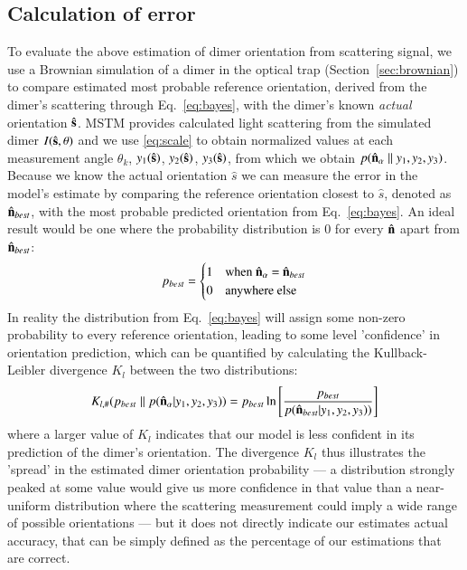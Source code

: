 \documentclass[final,  3p]{elsarticle}
\begin{document}
\subsection{Calculation of error}
\label{sec:divergence}
To evaluate the above estimation of dimer orientation from scattering signal, we use a Brownian simulation of a dimer in the optical trap (Section~\ref{sec:brownian}) to compare estimated most probable reference orientation, derived from the dimer's scattering through Eq.~\eqref{eq:bayes}, with the dimer's known \emph{actual} orientation $\hat{\bf s}$. MSTM provides calculated light scattering from the simulated dimer $I(\hat{\bf s}, \theta)$ and we use \eqref{eq:scale} to obtain normalized values at each measurement angle $\theta_k$,  $y_1(\hat{\bf s})$, $y_2(\hat{\bf s})$, $y_3(\hat{\bf s})$, from which we obtain $p(\hat{\bf n}_{\alpha}\parallel y_1, y_2, y_3)$. Because we know the actual orientation $\hat{s}$ we can measure the error in the model's estimate by comparing the reference orientation closest to $\hat{s}$, denoted as $\hat{\bf n}_{best}$, with the most probable predicted orientation from Eq.~\eqref{eq:bayes}. An ideal result would be one where the probability distribution is 0 for every $\hat{\bf n}$ apart from $\hat{\bf n}_{best}$:
\begin{align}
	\label{eq:best}
	p_{best} = 
	\begin{cases}
		1 & \text{when $\hat{\bf n}_\alpha$ = $\hat{\bf n}_{best}$}\\
		0 & \text{anywhere else}
	\end{cases}
\end{align}
In reality the distribution from Eq.~\eqref{eq:bayes} will assign some non-zero
probability to every reference orientation, leading to some level 'confidence' in orientation prediction, which can be quantified by calculating the Kullback-Leibler divergence $K_l$ between the two distributions:
\begin{align}
	K_{l, \#}(p_{best}\parallel p(\hat{\bf n}_\alpha| y_1, y_2, y_3))
	= p_{best}\ln \left[\frac{p_{best}}{p(\hat{\bf n}_{best}| y_1,y_2,y_3))}
	\right]
	\label{eq;kullback}
\end{align}
where a larger value of $K_l$ indicates that our model is less confident in its
prediction of the dimer's orientation. The divergence $K_l$ thus illustrates the 'spread'
in the estimated dimer orientation probability --- a distribution strongly peaked at 
some value would give us more confidence in that value than a near-uniform distribution 
where the scattering measurement could imply a wide range of possible orientations --- 
but it does not directly indicate our estimates actual accuracy, that can be simply defined as the percentage of our estimations that are correct. 
\end{document}
